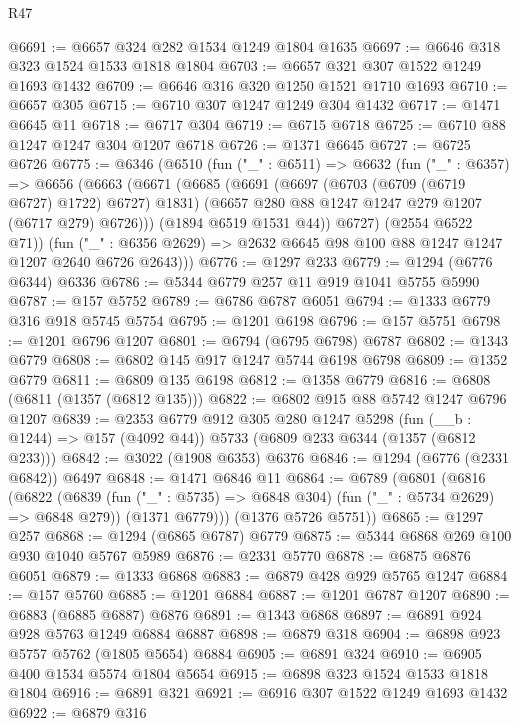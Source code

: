 \begin{lexlean}{R47}
\begin{coremodule}
@6691 := @6657 @324 @282 @1534 @1249 @1804 @1635
@6697 := @6646 @318 @323 @1524 @1533 @1818 @1804
@6703 := @6657 @321 @307 @1522 @1249 @1693 @1432
@6709 := @6646 @316 @320 @1250 @1521 @1710 @1693
@6710 := @6657 @305
@6715 := @6710 @307 @1247 @1249 @304 @1432
@6717 := @1471 @6645 @11
@6718 := @6717 @304
@6719 := @6715 @6718
@6725 := @6710 @88 @1247 @1247 @304 @1207 @6718
@6726 := @1371 @6645
@6727 := @6725 @6726
@6775 := @6346
    (@6510
      (fun ("_" : @6511) =>
      @6632
        (fun ("_" : @6357) =>
        @6656
          (@6663
            (@6671
              (@6685
                (@6691
                  (@6697 (@6703 (@6709 (@6719 @6727) @1722) @6727) @1831)
                  (@6657 @280 @88 @1247 @1247 @279 @1207 (@6717 @279) @6726)))
              (@1894 @6519 @1531 @44))
            @6727)
          (@2554 @6522 @71))
        (fun ("_" : @6356 @2629) => @2632 @6645 @98 @100 @88 @1247 @1247 @1207 @2640 @6726 @2643)))
@6776 := @1297 @233
@6779 := @1294 (@6776 @6344) @6336
@6786 := @5344 @6779 @257 @11 @919 @1041 @5755 @5990
@6787 := @157 @5752
@6789 := @6786 @6787 @6051
@6794 := @1333 @6779 @316 @918 @5745 @5754
@6795 := @1201 @6198
@6796 := @157 @5751
@6798 := @1201 @6796 @1207
@6801 := @6794 (@6795 @6798) @6787
@6802 := @1343 @6779
@6808 := @6802 @145 @917 @1247 @5744 @6198 @6798
@6809 := @1352 @6779
@6811 := @6809 @135 @6198
@6812 := @1358 @6779
@6816 := @6808 (@6811 (@1357 (@6812 @135)))
@6822 := @6802 @915 @88 @5742 @1247 @6796 @1207
@6839 := @2353
    @6779
    @912
    @305
    @280
    @1247
    @5298
    (fun (__b : @1244) => @157 (@4092 @44))
    @5733
    (@6809 @233 @6344 (@1357 (@6812 @233)))
@6842 := @3022 (@1908 @6353) @6376
@6846 := @1294 (@6776 (@2331 @6842)) @6497
@6848 := @1471 @6846 @11
@6864 := @6789
    (@6801
      (@6816
        (@6822
          (@6839 (fun ("_" : @5735) => @6848 @304) (fun ("_" : @5734 @2629) => @6848 @279))
          (@1371 @6779)))
      (@1376 @5726 @5751))
@6865 := @1297 @257
@6868 := @1294 (@6865 @6787) @6779
@6875 := @5344 @6868 @269 @100 @930 @1040 @5767 @5989
@6876 := @2331 @5770
@6878 := @6875 @6876 @6051
@6879 := @1333 @6868
@6883 := @6879 @428 @929 @5765 @1247
@6884 := @157 @5760
@6885 := @1201 @6884
@6887 := @1201 @6787 @1207
@6890 := @6883 (@6885 @6887) @6876
@6891 := @1343 @6868
@6897 := @6891 @924 @928 @5763 @1249 @6884 @6887
@6898 := @6879 @318
@6904 := @6898 @923 @5757 @5762 (@1805 @5654) @6884
@6905 := @6891 @324
@6910 := @6905 @400 @1534 @5574 @1804 @5654
@6915 := @6898 @323 @1524 @1533 @1818 @1804
@6916 := @6891 @321
@6921 := @6916 @307 @1522 @1249 @1693 @1432
@6922 := @6879 @316

\end{coremodule}
\end{lexlean}
